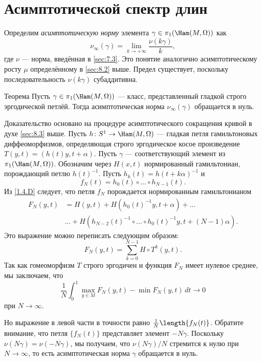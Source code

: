 \section{Асимптотической спектр длин}\label{sec:11.2}

Определим \emph{асимптотическую норму} элемента
$\gamma\in\pi_1(\Ham(M, \Omega))$ как
\[\nu_\infty(\gamma)=\lim_{k\to+\infty}\frac{\nu(k\gamma)}{k},\]
где $\nu$ --- норма, введённая в \ref{sec:7.3}. 
Это понятие аналогично асимптотическому росту $\mu$ определённому в
\ref{sec:8.2} выше.
Предел существует, поскольку последовательность $\nu(k\gamma)$ субаддитивна.

\begin{thm}{Теорема}\label{11.2.A}
Пусть $\gamma\in\pi_1(\Ham(M,\Omega))$ --- класс, представленный
гладкой строго эргодической петлёй.
Тогда асимптотическая норма $\nu_\infty (\gamma)$ обращается в нуль.
\end{thm}

Доказательство основано на процедуре асимптотического сокращения
кривой в духе \ref{sec:8.3} выше. 
Пусть $h\: S^1 \to \Ham(M,\Omega)$ --- гладкая петля гамильтоновых
диффеоморфизмов, определяющая строго эргодическое косое произведение
$T(y, t) = (h(t)y, t+\alpha)$. 
Пусть $\gamma$ --- соответствующий элемент из $\pi_1(\Ham(M, \Omega))$.
Обозначим через $H(x, t)$ нормированный гамильтониан, порождающий
петлю $h(t)^{-1}$. 
Пусть $h_k(t) = h(t + k\alpha)^{-1}$ и  
\[f_N(t) = h_0(t) \circ \dots \circ h_{N-1}(t).\]
Из \ref{1.4.D} следует, что петля $f_N$ порождается нормированным гамильтонианом 
\begin{align*}
F_N(y,t)
&=
H(y,t)
+ H(h_0(t)^{-1}y,t+\alpha)
+\dots
\\
&\dots
+
H(h_{N-2} (t)^{-1} \circ \dots\circ h_0(t)^{-1}y, t + (N - 1)\alpha).
\end{align*}
Это выражение можно переписать следующим образом:
\[F_N(y, t) = \sum_{k=0}^{N-1} H\circ T^k(y, t).\]
Так как гомеоморфизм $T$ строго эргодичен и функция $F_N$ имеет
нулевое среднее, мы заключаем, что
\[\frac1N\int_0^1\max_{y\in M}F_N(y, t) - \min F_N(y, t)\,dt \to 0\]
при $N \to \infty$.

Но выражение в левой части в точности равно $\frac1N\length\{f_N(t)\}$.
Обратите внимание, что петля $\{f_N(t)\}$ представляет элемент $-N\gamma$.
Поскольку $\nu(N\gamma) = \nu(-N\gamma)$, мы получаем, что
$\nu(N\gamma)/N$ стремится к нулю при $N \to \infty$, 
то есть асимптотическая норма $\gamma$ обращается в нуль.
\qeds
{}

